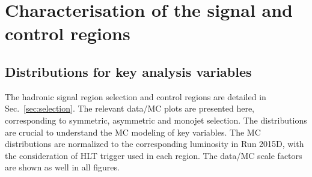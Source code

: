 \section{Characterisation of the signal and control regions}
\label{sec:yields}

\subsection{Distributions for key analysis variables \label{sec:mc-data-comp}}

The hadronic signal region selection and control regions are detailed in Sec.~\ref{sec:selection}. The relevant data/MC plots are presented here, corresponding to symmetric, asymmetric and monojet selection. The distributions are crucial to understand the MC modeling of key variables. The MC distributions are normalized to the corresponding luminosity in Run 2015D, with the consideration of HLT trigger used in each region. The data/MC scale factors are shown as well in all figures.
